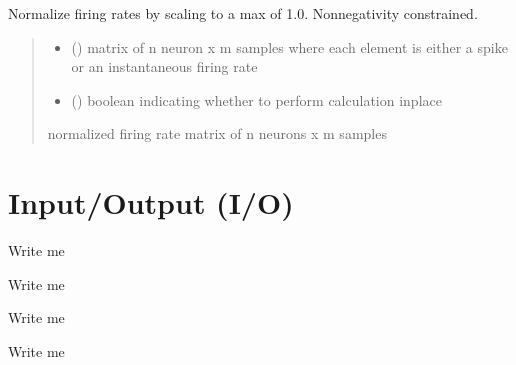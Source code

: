 \documentclass[letterpaper,10pt,english]{sphinxmanual}
\begin{document}

\begin{fulllineitems}
\label{\detokenize{CalSciPy.event_processing:CalSciPy.event_processing.normalize_firing_rates}}
\pysigstartsignatures
{}
\pysigstopsignatures
\sphinxAtStartPar
Normalize firing rates by scaling to a max of 1.0. Non\sphinxhyphen{}negativity constrained.
\begin{quote}\begin{description}
\begin{itemize}
\item {} 
\sphinxAtStartPar
{} () \sphinxhyphen{}\sphinxhyphen{} matrix of n neuron x m samples where each element is either a spike or an
instantaneous firing rate

\item {} 
\sphinxAtStartPar
{} () \sphinxhyphen{}\sphinxhyphen{} boolean indicating whether to perform calculation in\sphinxhyphen{}place

\end{itemize}

\sphinxAtStartPar
normalized firing rate matrix of n neurons x m samples

\sphinxAtStartPar
{}

\end{description}\end{quote}

\end{fulllineitems}



\section{Input/Output (I/O)}
\label{\detokenize{Sub-Packages:input-output-i-o}}\label{\detokenize{Sub-Packages:io-module}}
\begin{DUlineblock}{0em}
\item[] Write me
\item[] Write me
\item[] Write me
\item[] Write me
\end{DUlineblock}
\end{document}
